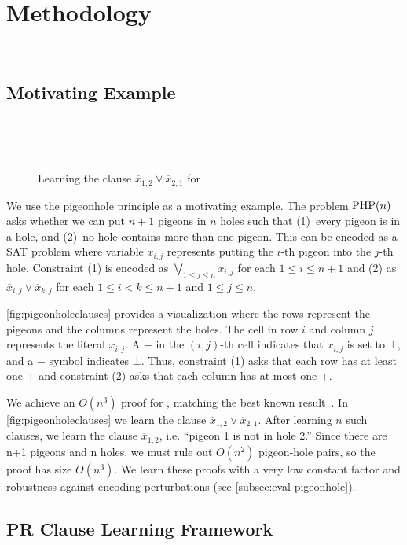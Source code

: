 \section{Methodology}~\label{sec:method}

\subsection{Motivating Example}~\label{sec:motivatex}

\begin{figure*}[!t]
    \centering
    
    \caption{Learning the clause $\overline{x}_{1, 2} \lor \overline{x}_{2, 1}$
    for }~\label{fig:pigeonholeclauses}
  \end{figure*}

We use the pigeonhole principle as a motivating example. The problem $\mathrm{PHP}(n)$
asks whether we can put $n+1$ pigeons in $n$ holes such that (1)~every pigeon is
in a hole, and (2)~no hole contains more than one pigeon. This can be encoded as
a SAT problem where variable $x_{i, j}$ represents putting the $i$-th pigeon
into the $j$-th hole. Constraint (1) is encoded as $\bigvee_{1 \leq j \leq n}
x_{i, j}$ for each $1 \leq i \leq n+1$ and (2) as $\overline{x}_{i, j} \lor
\overline{x}_{k, j}$ for each $ 1 \leq i < k \leq n+1$ and $1 \leq j \leq n$.

\autoref{fig:pigeonholeclauses} provides a visualization where the rows
represent the pigeons and the columns represent the holes. The cell in row $i$
and column $j$ represents the literal $x_{i, j}$.
A $+$ in the $(i, j)$-th cell indicates that $x_{i, j}$ is set to $\top$, and a
$-$ symbol indicates $\bot$. Thus, constraint (1) asks that each row has at
least one $+$ and constraint (2) asks that each column has at most one $+$.

We achieve an $O(n^3)$ \pr proof for , matching the best known
result~\cite{prclauses}. In \autoref{fig:pigeonholeclauses} we learn the clause
$\overline{x}_{1, 2} \lor \overline{x}_{2, 1}$. After learning $n$ such clauses,
we learn the clause $\overline{x}_{1, 2}$, i.e. “pigeon 1 is not in hole 2.”
Since there are n+1 pigeons and n holes, we must rule out $O(n^2)$ pigeon-hole
pairs, so the proof has size $O(n^3)$. We learn these proofs with a very low
constant factor and robustness against encoding perturbations (see
\autoref{subsec:eval-pigeonhole}).

\subsection{PR Clause Learning Framework}~\label{subsec:methodology}

